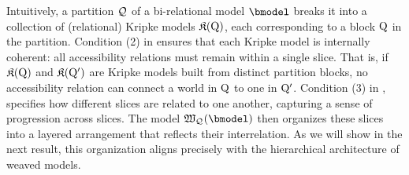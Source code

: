 

Intuitively, a partition $\mathcal{Q}_{}$ of a bi-relational model $\bmodel$ breaks it into a collection of (relational) Kripke models $\mathfrak{K}(\mathrm{Q})$, each corresponding to a block $\mathrm{Q}$ in the partition. Condition (2) in  ensures that each Kripke model is internally coherent: all accessibility relations must remain within a single slice. That is, if $\mathfrak{K}(\mathrm{Q})$ and $\mathfrak{K}(\mathrm{Q}')$ are Kripke models built from distinct partition blocks, no accessibility relation can connect a world in $\mathrm{Q}$ to one in $\mathrm{Q}'$.
Condition (3) in , specifies how different slices are related to one another, capturing a sense of progression across slices.
The model $\wmofbm\QQs$ then organizes these slices into a layered arrangement that reflects their interrelation. As we will show in the next result, this organization aligns precisely with the hierarchical architecture of weaved models.

